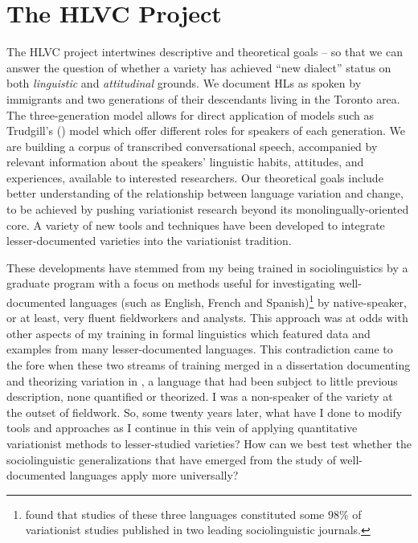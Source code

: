 \documentclass[output=paper]{LSP/langsci}
\begin{document}
\section{The HLVC Project}

The HLVC project intertwines descriptive and theoretical goals – so that we can answer the question of whether a variety has achieved “new dialect” status on both \textit{linguistic} and \textit{attitudinal} grounds. We document HLs as spoken by immigrants and two generations of their descendants living in the Toronto area. The three-generation model allows for direct application of models such as Trudgill’s (\citeyear{trudgill_dialects_1986}) model which offer different roles for speakers of each generation. We are building a corpus of transcribed conversational speech, accompanied by relevant information about the speakers’ linguistic habits, attitudes, and experiences, available to interested researchers. Our theoretical goals include better understanding of the relationship between language variation and change, to be achieved by pushing variationist research beyond its monolingually-oriented core. A variety of new tools and techniques have been developed to integrate lesser-documented varieties into the variationist tradition. 

These developments have stemmed from my being trained in sociolinguistics by a graduate program with a focus on methods useful for investigating well-documented languages (such as English, French and Spanish)\footnote{\citet{nagy_love_2008} found that studies of these three languages constituted some 98\% of variationist studies published in two leading sociolinguistic journals.} by native-speaker, or at least, very fluent fieldworkers and analysts. This approach was at odds with other aspects of my training in formal linguistics which featured data and examples from many lesser-documented languages. This contradiction came to the fore when these two streams of training merged in a dissertation documenting and theorizing variation in  \citep{nagy_language_1996}, a language that had been subject to little previous description, none quantified or theorized. I was a non-speaker of the variety at the outset of fieldwork. So, some twenty years later, what have I done to modify tools and approaches as I continue in this vein of applying quantitative variationist methods to lesser-studied varieties? How can we best test whether the sociolinguistic generalizations that have emerged from the study of well-documented languages apply more universally?
\end{document}
